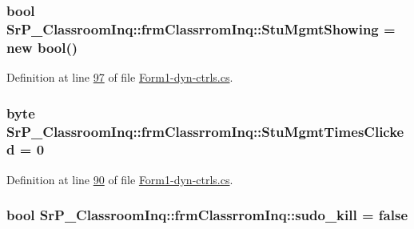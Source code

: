 \hypertarget{class_sr_p___classroom_inq_1_1frm_classrrom_inq_a6a40312dc72ead57d8d40d415ee14a07}{
\subsubsection[{\-Stu\-Mgmt\-Showing}]{\setlength{\rightskip}{0pt plus 5cm}bool {\bf \-Sr\-P\-\_\-\-Classroom\-Inq\-::frm\-Classrrom\-Inq\-::\-Stu\-Mgmt\-Showing} = new bool()}}
\label{class_sr_p___classroom_inq_1_1frm_classrrom_inq_a6a40312dc72ead57d8d40d415ee14a07}


\-Definition at line \hyperlink{_form1-dyn-ctrls_8cs_source_l00097}{97} of file \hyperlink{_form1-dyn-ctrls_8cs_source}{\-Form1-\/dyn-\/ctrls.\-cs}.

\hypertarget{class_sr_p___classroom_inq_1_1frm_classrrom_inq_a8746b34d859922daf9b2d5b00cef317e}{
\subsubsection[{\-Stu\-Mgmt\-Times\-Clicked}]{\setlength{\rightskip}{0pt plus 5cm}byte {\bf \-Sr\-P\-\_\-\-Classroom\-Inq\-::frm\-Classrrom\-Inq\-::\-Stu\-Mgmt\-Times\-Clicked} = 0}}
\label{class_sr_p___classroom_inq_1_1frm_classrrom_inq_a8746b34d859922daf9b2d5b00cef317e}


\-Definition at line \hyperlink{_form1-dyn-ctrls_8cs_source_l00090}{90} of file \hyperlink{_form1-dyn-ctrls_8cs_source}{\-Form1-\/dyn-\/ctrls.\-cs}.

\hypertarget{class_sr_p___classroom_inq_1_1frm_classrrom_inq_a3ac2217a30904b65be786ee00a312fea}{
\subsubsection[{sudo\-\_\-kill}]{\setlength{\rightskip}{0pt plus 5cm}bool {\bf \-Sr\-P\-\_\-\-Classroom\-Inq\-::frm\-Classrrom\-Inq\-::sudo\-\_\-kill} = false}}
\label{class_sr_p___classroom_inq_1_1frm_classrrom_inq_a3ac2217a30904b65be786ee00a312fea}


